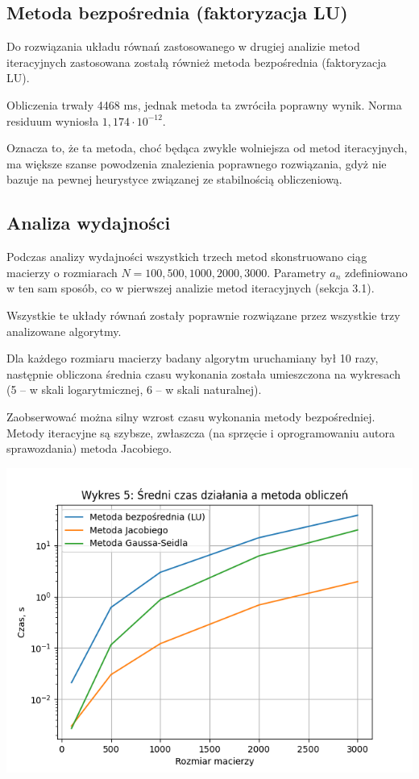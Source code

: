 \documentclass{article}
\begin{document}
\subsection{Metoda bezpośrednia (faktoryzacja LU)}

Do rozwiązania układu równań zastosowanego w drugiej analizie metod iteracyjnych zastosowana zostałą również metoda bezpośrednia (faktoryzacja LU). 

Obliczenia trwały 4468 ms, jednak metoda ta zwróciła poprawny wynik. Norma residuum wyniosła $1,174 \cdot 10^{-12}$.

Oznacza to, że ta metoda, choć będąca zwykle wolniejsza od metod iteracyjnych, ma większe szanse powodzenia znalezienia poprawnego rozwiązania, gdyż nie bazuje na pewnej heurystyce związanej ze stabilnością obliczeniową.

\subsection{Analiza wydajności}

Podczas analizy wydajności wszystkich trzech metod skonstruowano ciąg macierzy o rozmiarach $N = 100, 500, 1000, 2000, 3000$. Parametry $a_n$ zdefiniowano w ten sam sposób, co w pierwszej analizie metod iteracyjnych (sekcja 3.1).

Wszystkie te układy równań zostały poprawnie rozwiązane przez wszystkie trzy analizowane algorytmy.

Dla każdego rozmiaru macierzy badany algorytm uruchamiany był 10 razy, następnie obliczona średnia czasu wykonania została umieszczona na wykresach (5 -- w skali logarytmicznej, 6 -- w skali naturalnej).

Zaobserwować można silny wzrost czasu wykonania metody bezpośredniej. Metody iteracyjne są szybsze, zwłaszcza (na sprzęcie i oprogramowaniu autora sprawozdania) metoda Jacobiego.

\includegraphics[scale=0.67]{chart5.png}
\end{document}
